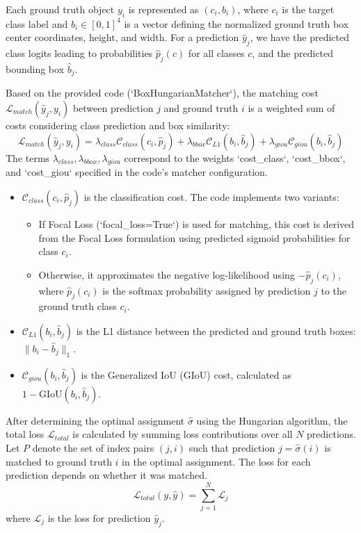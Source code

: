 Each ground truth object $ y_i $ is represented as $ (c_i, b_i) $, where $ c_i $ is the target class label and $ b_i \in [0, 1]^4 $ is a vector defining the normalized ground truth box center coordinates, height, and width. For a prediction $ \hat{y}_j $, we have the predicted class logits leading to probabilities $ \hat{p}_j(c) $ for all classes $ c $, and the predicted bounding box $ \hat{b}_j $.

Based on the provided code (`BoxHungarianMatcher`), the matching cost $ \mathcal{L}_{match}(\hat{y}_j, y_i) $ between prediction $ j $ and ground truth $ i $ is a weighted sum of costs considering class prediction and box similarity:
\begin{equation}
    \mathcal{L}_{match}(\hat{y}_j, y_i) = \lambda_{class} \mathcal{C}_{class}(c_i, \hat{p}_j) + \lambda_{bbox} \mathcal{C}_{L1}(b_i, \hat{b}_j) + \lambda_{giou} \mathcal{C}_{giou}(b_i, \hat{b}_j)
    \label{eq:match_cost_revised}
\end{equation}
The terms $ \lambda_{class}, \lambda_{bbox}, \lambda_{giou} $ correspond to the weights `cost_class`, `cost_bbox`, and `cost_giou` specified in the code's matcher configuration.
\begin{itemize}
    \item $ \mathcal{C}_{class}(c_i, \hat{p}_j) $ is the classification cost. The code implements two variants:
        \begin{itemize}
            \item If Focal Loss (`focal_loss=True`) is used for matching, this cost is derived from the Focal Loss formulation using predicted sigmoid probabilities for class $c_i$.
            \item Otherwise, it approximates the negative log-likelihood using $ -\hat{p}_j(c_i) $, where $ \hat{p}_j(c_i) $ is the softmax probability assigned by prediction $j$ to the ground truth class $ c_i $.
        \end{itemize}
    \item $ \mathcal{C}_{L1}(b_i, \hat{b}_j) $ is the L1 distance between the predicted and ground truth boxes: $ \|b_i - \hat{b}_j\|_1 $.
    \item $ \mathcal{C}_{giou}(b_i, \hat{b}_j) $ is the Generalized IoU (GIoU) cost, calculated as $ 1 - \text{GIoU}(b_i, \hat{b}_j) $.
\end{itemize}

After determining the optimal assignment $ \hat{\sigma} $ using the Hungarian algorithm, the total loss $ \mathcal{L}_{total} $ is calculated by summing loss contributions over all $N$ predictions. Let $ P $ denote the set of index pairs $ (j, i) $ such that prediction $ j = \hat{\sigma}(i) $ is matched to ground truth $ i $ in the optimal assignment. The loss for each prediction depends on whether it was matched.
\begin{equation}
    \mathcal{L}_{total}(y, \hat{y}) = \sum_{j=1}^N \mathcal{L}_j
    \label{eq:total_loss_revised}
\end{equation}
where $ \mathcal{L}_j $ is the loss for prediction $ \hat{y}_j $.

